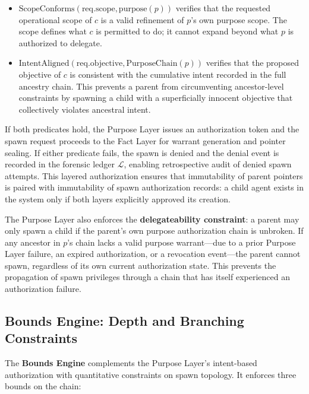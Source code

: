 \begin{itemize}
    \item $\text{ScopeConforms}(\text{req}.\text{scope}, \text{purpose}(p))$ verifies that the requested operational scope of $c$ is a valid refinement of $p$'s own purpose scope. The scope defines what $c$ is permitted to do; it cannot expand beyond what $p$ is authorized to delegate.
    \item $\text{IntentAligned}(\text{req}.\text{objective}, \text{PurposeChain}(p))$ verifies that the proposed objective of $c$ is consistent with the cumulative intent recorded in the full ancestry chain. This prevents a parent from circumventing ancestor-level constraints by spawning a child with a superficially innocent objective that collectively violates ancestral intent.
\end{itemize}

If both predicates hold, the Purpose Layer issues an authorization token and the spawn request proceeds to the Fact Layer for warrant generation and pointer sealing. If either predicate fails, the spawn is denied and the denial event is recorded in the forensic ledger $\mathcal{L}$, enabling retrospective audit of denied spawn attempts. This layered authorization ensures that immutability of parent pointers is paired with immutability of spawn authorization records: a child agent exists in the system only if both layers explicitly approved its creation.

The Purpose Layer also enforces the \textbf{delegateability constraint}: a parent may only spawn a child if the parent's own purpose authorization chain is unbroken. If any ancestor in $p$'s chain lacks a valid purpose warrant—due to a prior Purpose Layer failure, an expired authorization, or a revocation event—the parent cannot spawn, regardless of its own current authorization state. This prevents the propagation of spawn privileges through a chain that has itself experienced an authorization failure.

\subsection{Bounds Engine: Depth and Branching Constraints}\label{sec:bounds-engine}

The \textbf{Bounds Engine} complements the Purpose Layer's intent-based authorization with quantitative constraints on spawn topology. It enforces three bounds on the chain:

